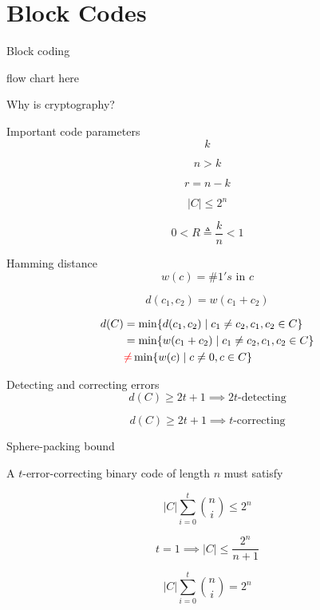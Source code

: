 \section{Block Codes}

\begin{frame}{Block coding}
  \centerline{flow chart here}

  \centerline{Why is cryptography?}
\end{frame}
\begin{frame}{Important code parameters}
  \[
	k
  \]

  \[
	n > k
  \]

  \[
	r = n - k
  \]

  \[
	|C| \le 2^n
  \]

  \[
	0 < R \triangleq \frac{k}{n} < 1
  \]
\end{frame}
\begin{frame}{Hamming distance}
  \[
	w(c) = \# 1's \text{ in } c
  \]

  \[
	d(c_1, c_2) = w(c_1 + c_2)
  \]

  \[
	\begin{aligned}
	  d(C) &= \min \{d(c_1, c_2) \mid c_1 \neq c_2, c_1, c_2 \in C\} \\
	  &= \min \{w(c_1 + c_2) \mid c_1 \neq c_2, c_1, c_2 \in C\} \\
	  &\textcolor{red}{\neq} \min \{w(c) \mid c \neq 0, c \in C\}
	\end{aligned}
  \]
\end{frame}
\begin{frame}{Detecting and correcting errors}
  \[
	d(C) \ge 2t + 1 \implies 2t\text{-detecting}
  \]

  \[
	d(C) \ge 2t + 1 \implies t\text{-correcting}
  \]
\end{frame}
\begin{frame}{Sphere-packing bound}
  \begin{theorem}
	A $t$-error-correcting binary code of length $n$ must satisfy

	\[
	  |C| \sum_{i=0}^{t} \binom{n}{i} \le 2^n
	\]
  \end{theorem}

  \[
	t = 1 \implies |C| \le \frac{2^n}{n + 1}
  \]

  \begin{definition}
	\[
	  |C| \sum_{i=0}^{t} \binom{n}{i} = 2^n
	\]
  \end{definition}
\end{frame}
